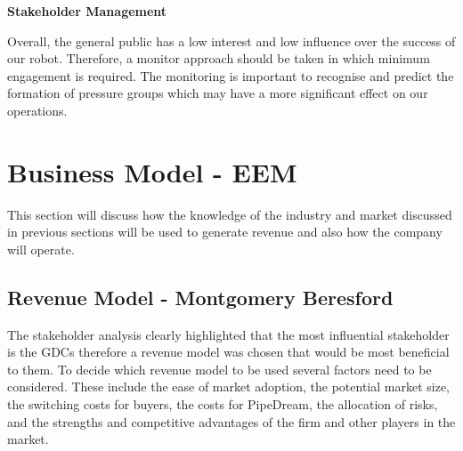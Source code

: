 \documentclass[11pt]{article}		%
\begin{document}
	        \textbf{Stakeholder Management}
	        
	        Overall, the general public has a low interest and low influence over the success of our robot. Therefore, a monitor approach should be taken in which minimum engagement is required. The monitoring is important to recognise and predict the formation of pressure groups which may have a more significant effect on our operations. 
        	

	\section{Business Model - EEM}
	        
    This section will discuss how the knowledge of the industry and market discussed in previous sections will be used to generate revenue and also how the company will operate.
    
		\subsection[Revenue Model]{Revenue Model - Montgomery Beresford}
     The stakeholder analysis clearly highlighted that the most influential stakeholder is the GDCs therefore a revenue model was chosen that would be most beneficial to them. To decide which revenue model to be used several factors need to be considered. These include the ease of market adoption, the potential market size,  the switching costs for buyers, the costs for PipeDream, the allocation of risks, and the strengths and competitive advantages of the firm and other players in the market.
\end{document}
